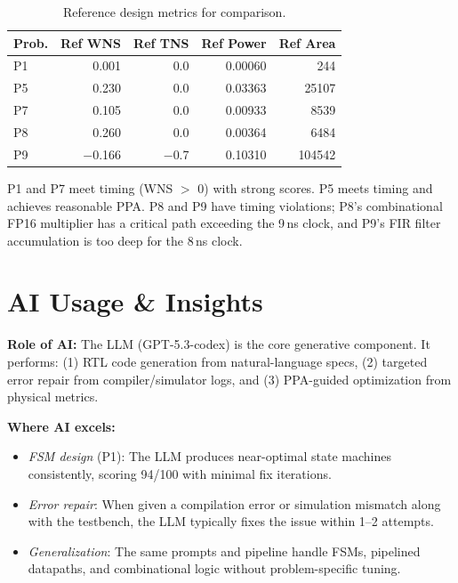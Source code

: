\documentclass[10pt]{article}
\begin{document}
\begin{table}[ht]
\centering
\small
\begin{tabular}{lrrrr}
\toprule
\textbf{Prob.} & \textbf{Ref WNS} & \textbf{Ref TNS} & \textbf{Ref Power} & \textbf{Ref Area} \\
\midrule
P1 & 0.001 & 0.0 & 0.00060 & 244 \\
P5 & 0.230 & 0.0 & 0.03363 & 25107 \\
P7 & 0.105 & 0.0 & 0.00933 & 8539 \\
P8 & 0.260 & 0.0 & 0.00364 & 6484 \\
P9 & $-$0.166 & $-$0.7 & 0.10310 & 104542 \\
\bottomrule
\end{tabular}
\caption{Reference design metrics for comparison.}
\end{table}

P1 and P7 meet timing (WNS $>$ 0) with strong scores. P5 meets timing and achieves reasonable PPA. 
P8 and P9 have timing violations; P8's combinational FP16 multiplier has a critical path exceeding 
the 9\,ns clock, and P9's FIR filter accumulation is too deep for the 8\,ns clock.

\section{AI Usage \& Insights}

\textbf{Role of AI:} The LLM (GPT-5.3-codex) is the core generative component. 
It performs: (1) RTL code generation from natural-language specs, 
(2) targeted error repair from compiler/simulator logs, and 
(3) PPA-guided optimization from physical metrics.

\textbf{Where AI excels:}
\begin{itemize}[topsep=2pt,itemsep=0pt]
  \item \emph{FSM design} (P1): The LLM produces near-optimal state machines consistently, 
    scoring 94/100 with minimal fix iterations.
  \item \emph{Error repair}: When given a compilation error or simulation mismatch along with the testbench, 
    the LLM typically fixes the issue within 1--2 attempts.
  \item \emph{Generalization}: The same prompts and pipeline handle FSMs, pipelined datapaths, 
    and combinational logic without problem-specific tuning.
\end{itemize}
\end{document}
